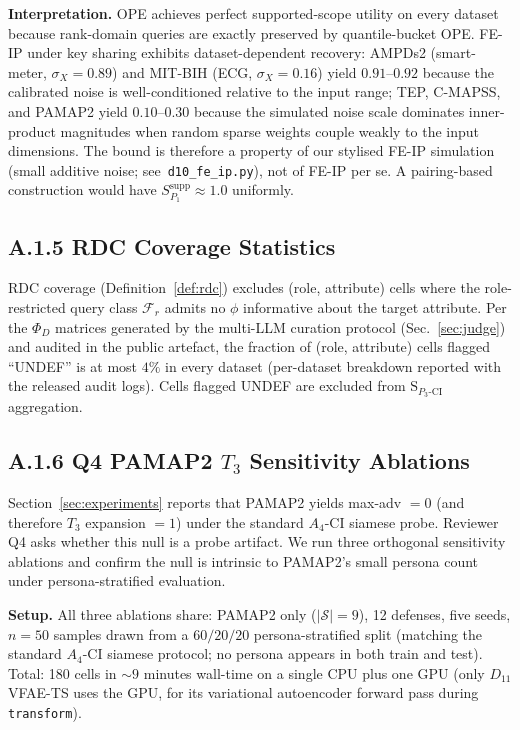 \documentclass{article}
\theoremstyle{remark}
\begin{document}
\textbf{Interpretation.} OPE achieves perfect supported-scope utility on every dataset because rank-domain queries are exactly preserved by quantile-bucket OPE. FE-IP under key sharing exhibits dataset-dependent recovery: AMPDs2 (smart-meter, $\sigma_X = 0.89$) and MIT-BIH (ECG, $\sigma_X = 0.16$) yield $0.91$--$0.92$ because the calibrated noise is well-conditioned relative to the input range; TEP, C-MAPSS, and PAMAP2 yield $0.10$--$0.30$ because the simulated noise scale dominates inner-product magnitudes when random sparse weights couple weakly to the input dimensions. The bound is therefore a property of our stylised FE-IP simulation (small additive noise; see~\texttt{d10\_fe\_ip.py}), not of FE-IP per se. A pairing-based construction would have $S_{P_1}^{\text{supp}} \approx 1.0$ uniformly.

\subsection*{A.1.5 RDC Coverage Statistics}
RDC coverage (Definition~\ref{def:rdc}) excludes (role, attribute) cells where the role-restricted query class $\mathcal{F}_r$ admits no $\phi$ informative about the target attribute. Per the $\Phi_D$ matrices generated by the multi-LLM curation protocol (Sec.~\ref{sec:judge}) and audited in the public artefact, the fraction of (role, attribute) cells flagged ``UNDEF'' is at most $4\%$ in every dataset (per-dataset breakdown reported with the released audit logs). Cells flagged UNDEF are excluded from $\mathrm{S}_{P_3\text{-CI}}$ aggregation.

\subsection*{A.1.6 Q4 PAMAP2 $T_3$ Sensitivity Ablations}

Section~\ref{sec:experiments} reports that PAMAP2 yields max-adv $= 0$ (and therefore $T_3$ expansion $= 1$) under the standard $A_4$-CI siamese probe. Reviewer Q4 asks whether this null is a probe artifact. We run three orthogonal sensitivity ablations and confirm the null is intrinsic to PAMAP2's small persona count under persona-stratified evaluation.

\textbf{Setup.} All three ablations share: PAMAP2 only ($|\mathcal{S}| = 9$), 12 defenses, five seeds, $n=50$ samples drawn from a $60/20/20$ persona-stratified split (matching the standard $A_4$-CI siamese protocol; no persona appears in both train and test). Total: 180 cells in ${\sim}9$ minutes wall-time on a single CPU plus one GPU (only $D_{11}$ VFAE-TS uses the GPU, for its variational autoencoder forward pass during \texttt{transform}).
\end{document}
